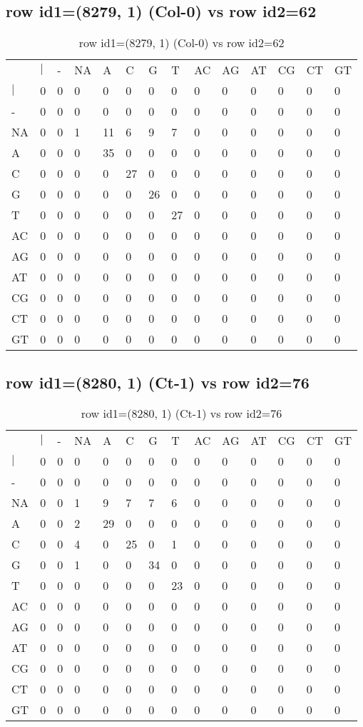 \subsection{row id1=(8279, 1) (Col-0) vs row id2=62}
\begin{center}
\begin{longtable}{|l|l|l|l|l|l|l|l|l|l|l|l|l|l|}
\caption{row id1=(8279, 1) (Col-0) vs row id2=62} \label{table_dm246}\\
\hline
\\
\hline
&$|$&-&NA&A&C&G&T&AC&AG&AT&CG&CT&GT\\
$|$&0&0&0&0&0&0&0&0&0&0&0&0&0\\
-&0&0&0&0&0&0&0&0&0&0&0&0&0\\
NA&0&0&1&11&6&9&7&0&0&0&0&0&0\\
A&0&0&0&35&0&0&0&0&0&0&0&0&0\\
C&0&0&0&0&27&0&0&0&0&0&0&0&0\\
G&0&0&0&0&0&26&0&0&0&0&0&0&0\\
T&0&0&0&0&0&0&27&0&0&0&0&0&0\\
AC&0&0&0&0&0&0&0&0&0&0&0&0&0\\
AG&0&0&0&0&0&0&0&0&0&0&0&0&0\\
AT&0&0&0&0&0&0&0&0&0&0&0&0&0\\
CG&0&0&0&0&0&0&0&0&0&0&0&0&0\\
CT&0&0&0&0&0&0&0&0&0&0&0&0&0\\
GT&0&0&0&0&0&0&0&0&0&0&0&0&0\\
\hline
\end{longtable}
\end{center}

\subsection{row id1=(8280, 1) (Ct-1) vs row id2=76}
\begin{center}
\begin{longtable}{|l|l|l|l|l|l|l|l|l|l|l|l|l|l|}
\caption{row id1=(8280, 1) (Ct-1) vs row id2=76} \label{table_dm248}\\
\hline
\\
\hline
&$|$&-&NA&A&C&G&T&AC&AG&AT&CG&CT&GT\\
$|$&0&0&0&0&0&0&0&0&0&0&0&0&0\\
-&0&0&0&0&0&0&0&0&0&0&0&0&0\\
NA&0&0&1&9&7&7&6&0&0&0&0&0&0\\
A&0&0&2&29&0&0&0&0&0&0&0&0&0\\
C&0&0&4&0&25&0&1&0&0&0&0&0&0\\
G&0&0&1&0&0&34&0&0&0&0&0&0&0\\
T&0&0&0&0&0&0&23&0&0&0&0&0&0\\
AC&0&0&0&0&0&0&0&0&0&0&0&0&0\\
AG&0&0&0&0&0&0&0&0&0&0&0&0&0\\
AT&0&0&0&0&0&0&0&0&0&0&0&0&0\\
CG&0&0&0&0&0&0&0&0&0&0&0&0&0\\
CT&0&0&0&0&0&0&0&0&0&0&0&0&0\\
GT&0&0&0&0&0&0&0&0&0&0&0&0&0\\
\hline
\end{longtable}
\end{center}

